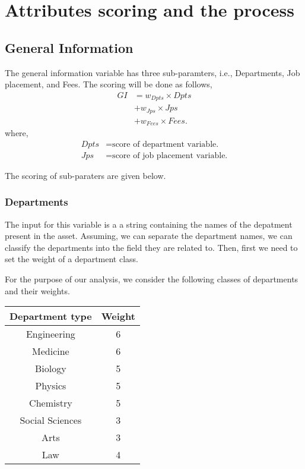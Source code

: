 \documentclass[oneside,twocolumn]{article}
\begin{document}
\section{Attributes scoring and the process}
\subsection{General Information}
The general information variable has three sub-paramters, i.e.,
Departments, Job placement, and Fees. The scoring will be
done as follows,
\begin{align*}
	GI &= w_{Dpts} \times Dpts \\
	   &+ w_{Jps} \times Jps \\
	   &+ w_{Fees} \times Fees.
\end{align*}
where,
\begin{align*}
	Dpts &= \text{score of department variable.} \\
	Jps &= \text{score of job placement variable.}
\end{align*}

The scoring of sub-paraters are given below.

\subsubsection{Departments}
The input for this variable is a a string containing the
names of the depatment present in the asset. Assuming, we
can separate the department names, we can classify the
departments into the field they are related to. Then, first
we need to set the weight of a department class.

For the purpose of our analysis, we consider the following
classes of departments and their weights.
\begin{center}
  \begin{tabular}{c|c}
    \hline
    Department type & Weight \\ \hline
    Engineering     & 6 \\
    Medicine        & 6 \\
    Biology         & 5 \\
    Physics         & 5 \\
    Chemistry       & 5 \\
    Social Sciences & 3 \\
    Arts            & 3 \\
    Law             & 4 \\ \hline
  \end{tabular}
\end{center}
\end{document}
